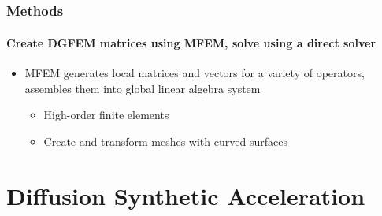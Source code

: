 \documentclass[compress,t]{beamer}
\begin{document}
\subsection{}
\begin{frame}
\frametitle{Methods}
\framesubtitle{Create DGFEM matrices using MFEM, solve using a direct solver}

\begin{itemize}
\item{MFEM generates local matrices and vectors for a variety of operators, assembles them into global linear algebra system}
\begin{itemize}
\item{High-order finite elements}
\item{Create and transform meshes with curved surfaces}
\end{itemize}
\end{itemize}

\end{frame}

\section{Diffusion Synthetic Acceleration}
\subsection{}
\end{document}
